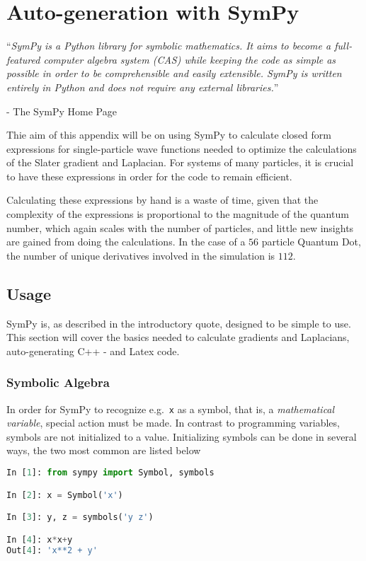 \chapter{Auto-generation with SymPy}
\label{appendix:sympy}

``\textit{SymPy is a Python library for symbolic mathematics. It aims to become a full-featured computer algebra system (CAS) while keeping the code as simple as possible in order to be comprehensible and easily extensible. SymPy is written entirely in Python and does not require any external libraries.}'' 

\hfill - The SymPy Home Page \cite{SymPy}

\vspace{0.5cm}
Thie aim of this appendix will be on using SymPy to calculate closed form expressions for single-particle wave functions needed to optimize the calculations of the Slater gradient and Laplacian. For systems of many particles, it is crucial to have these expressions in order for the code to remain efficient. 

Calculating these expressions by hand is a waste of time, given that the complexity of the expressions is proportional to the magnitude of the quantum number, which again scales with the number of particles, and little new insights are gained from doing the calculations. In the case of a $56$ particle Quantum Dot, the number of unique derivatives involved in the simulation is $112$. 

\section{Usage}

SymPy is, as described in the introductory quote, designed to be simple to use. This section will cover the basics needed to calculate gradients and Laplacians, auto-generating C++ - and Latex code.

\subsection{Symbolic Algebra}

In order for SymPy to recognize e.g.~\verb+x+ as a symbol, that is, a \textit{mathematical variable}, special action must be made. In contrast to programming variables, symbols are not initialized to a value. Initializing symbols can be done in several ways, the two most common are listed below

\vspace{0.25cm}
\begin{lstlisting}[language=Python]
In [1]: from sympy import Symbol, symbols

In [2]: x = Symbol('x')

In [3]: y, z = symbols('y z')

In [4]: x*x+y
Out[4]: 'x**2 + y'

\end{lstlisting}

